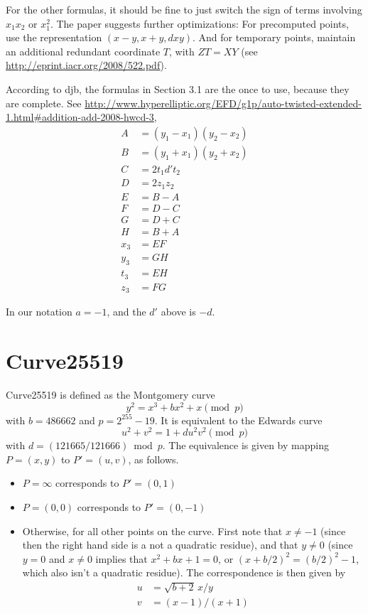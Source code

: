 \documentclass[a4paper]{article}
\begin{document}
For the other formulas, it should be fine to just switch the sign of
terms involving $x_1 x_2$ or $x_1^2$. The paper suggests further
optimizations: For precomputed points, use the representation $(x-y,
x+y, dxy)$. And for temporary points, maintain an additional redundant
coordinate $T$, with $Z T = X Y$ (see
\url{http://eprint.iacr.org/2008/522.pdf}).

According to djb, the formulas in Section 3.1 are the once to use,
because they are complete. See
\url{http://www.hyperelliptic.org/EFD/g1p/auto-twisted-extended-1.html#addition-add-2008-hwcd-3},
\begin{align*}
  A &= (y_1 - x_1)(y_2 - x_2) \\
  B &= (y_1 + x_1)(y_2 + x_2) \\
  C &= 2 t_1 d' t_2 \\
  D &= 2 z_1 z_2 \\
  E &= B - A \\
  F &= D - C \\
  G &= D + C \\
  H &= B + A \\
  x_3 &= E F \\
  y_3 &= G H \\
  t_3 &= E H \\
  z_3 &= F G
\end{align*}

In our notation $a = -1$, and the $d'$ above is $-d$.

\section{Curve25519}

Curve25519 is defined as the Montgomery curve
\begin{equation*}
  y^2 = x^3 + b x^2 + x \pmod p
\end{equation*}
with $b = 486662$ and $p = 2^{255} -19$. It is equivalent to the
Edwards curve
\begin{equation*}
  u^2 + v^2 = 1 + d u^2 v^2 \pmod p
\end{equation*}
with $d = (121665/121666) \bmod p$. The equivalence is given by
mapping $P = (x,y)$ to $P' = (u, v)$, as follows.
\begin{itemize}
\item $P = \infty$ corresponds to $P' = (0, 1)$
\item $P = (0, 0)$ corresponds to $P' = (0, -1)$
\item Otherwise, for all other points on the curve. First note that $x
  \neq -1$ (since then the right hand side is a not a quadratic
  residue), and that $y \neq 0$ (since $y = 0$ and $x \neq 0$ implies
  that $x^2 + bx + 1 = 0$, or $(x + b/2)^2 = (b/2)^2 - 1$, which also
  isn't a quadratic residue). The correspondence is then given by
  \begin{align*}
    u &= \sqrt{b+2} \, x / y \\
    v &= (x-1) / (x+1)
  \end{align*}
\end{itemize}
\end{document}
